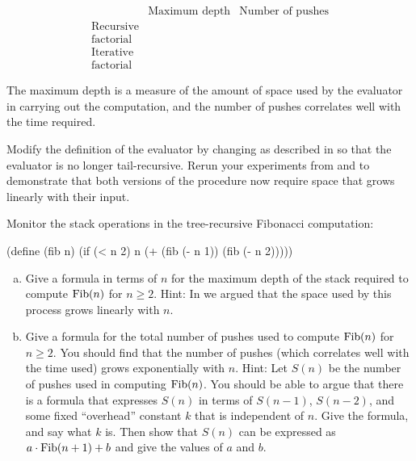 \begin{exerciseGroup}
\[
\renewcommand{\arraystretch}{1.2}
\begin{array}{c|c|c}
                 & \text{Maximum depth} & \text{Number of pushes} \\
\hline
\text{Recursive} &                      &                         \\
\text{factorial} &                      &                         \\
\hline
\text{Iterative} &                      &                         \\
\text{factorial} &                      &                         
\end{array}
\]

The maximum depth is a measure of the amount of space used by the evaluator in
carrying out the computation, and the number of pushes correlates well with the
time required.

\label{Exercise 5.28}
 Modify the definition of the
evaluator by changing  as described in 
so that the evaluator is no longer tail-recursive.  Rerun your experiments from
 and  to demonstrate that both versions
of the  procedure now require space that grows linearly with
their input.

\label{Exercise 5.29}
 Monitor the stack operations in
the tree-recursive Fibonacci computation:

\begin{codeBlock}
(define (fib n)
  (if (< n 2)
      n
      (+ (fib (- n 1)) (fib (- n 2)))))
\end{codeBlock}

\begin{enumerate}[a.]

\item
Give a formula in terms of \( n \) for the maximum depth of the stack required to
compute \( {\rm Fib}(n) \) for \( n \ge 2 \).  Hint: In  we
argued that the space used by this process grows linearly with \( n \).

\item
Give a formula for the total number of pushes used to compute \( {\rm Fib}(n) \)
for \( n \ge 2 \).  You should find that the number of pushes (which correlates
well with the time used) grows exponentially with \( n \).  Hint: Let
\( S(n) \) be the number of pushes used in computing \( {\rm Fib}(n) \).  You
should be able to argue that there is a formula that expresses \( S(n) \) in
terms of \( S(n - 1) \), \( S(n - 2) \), and some fixed ``overhead''
constant \( k \) that is independent of \( n \).  Give the formula, and say what
\( k \) is.  Then show that \( S(n) \) can be expressed as
\( a\cdot{\rm Fib}(n + 1) + b \) and give the values of \( a \) and \( b \).


\end{enumerate}
\end{exerciseGroup}
